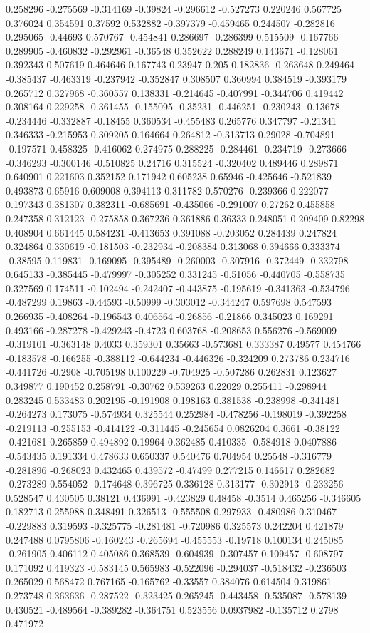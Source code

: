 0.258296 -0.275569 -0.314169 -0.39824 -0.296612 -0.527273 0.220246 0.567725 0.376024 0.354591 0.37592 0.532882 -0.397379 -0.459465 0.244507 -0.282816 0.295065 -0.44693 0.570767 -0.454841 0.286697 -0.286399 0.515509 -0.167766 0.289905 -0.460832 -0.292961 -0.36548 0.352622 0.288249 0.143671 -0.128061 0.392343 0.507619 0.464646 0.167743 0.23947 0.205 0.182836 -0.263648 0.249464 -0.385437 -0.463319 -0.237942 -0.352847 0.308507 0.360994 0.384519 -0.393179 0.265712 0.327968 -0.360557 0.138331 -0.214645 -0.407991 -0.344706 0.419442 0.308164 0.229258 -0.361455 -0.155095 -0.35231 -0.446251 -0.230243 -0.13678 -0.234446 -0.332887 -0.18455 0.360534 -0.455483 0.265776 0.347797 -0.21341 0.346333 -0.215953 0.309205 0.164664 0.264812 -0.313713 0.29028 -0.704891 -0.197571 0.458325 -0.416062 0.274975 0.288225 -0.284461 -0.234719 -0.273666 -0.346293 -0.300146 -0.510825 0.24716 0.315524 -0.320402 0.489446 0.289871 0.640901 0.221603 0.352152 0.171942 0.605238 0.65946 -0.425646 -0.521839 0.493873 0.65916 0.609008 0.394113 0.311782 0.570276 -0.239366 0.222077 0.197343 0.381307 0.382311 -0.685691 -0.435066 -0.291007 0.27262 0.455858 0.247358 0.312123 -0.275858 0.367236 0.361886 0.36333 0.248051 0.209409 0.82298 0.408904 0.661445 0.584231 -0.413653 0.391088 -0.203052 0.284439 0.247824 0.324864 0.330619 -0.181503 -0.232934 -0.208384 0.313068 0.394666 0.333374 -0.38595 0.119831 -0.169095 -0.395489 -0.260003 -0.307916 -0.372449 -0.332798 0.645133 -0.385445 -0.479997 -0.305252 0.331245 -0.51056 -0.440705 -0.558735 0.327569 0.174511 -0.102494 -0.242407 -0.443875 -0.195619 -0.341363 -0.534796 -0.487299 0.19863 -0.44593 -0.50999 -0.303012 -0.344247 0.597698 0.547593 0.266935 -0.408264 -0.196543 0.406564 -0.26856 -0.21866 0.345023 0.169291 0.493166 -0.287278 -0.429243 -0.4723 0.603768 -0.208653 0.556276 -0.569009 -0.319101 -0.363148 0.4033 0.359301 0.35663 -0.573681 0.333387 0.49577 0.454766 -0.183578 -0.166255 -0.388112 -0.644234 -0.446326 -0.324209 0.273786 0.234716 -0.441726 -0.2908 -0.705198 0.100229 -0.704925 -0.507286 0.262831 0.123627 0.349877 0.190452 0.258791 -0.30762 0.539263 0.22029 0.255411 -0.298944 0.283245 0.533483 0.202195 -0.191908 0.198163 0.381538 -0.238998 -0.341481 -0.264273 0.173075 -0.574934 0.325544 0.252984 -0.478256 -0.198019 -0.392258 -0.219113 -0.255153 -0.414122 -0.311445 -0.245654 0.0826204 0.3661 -0.38122 -0.421681 0.265859 0.494892 0.19964 0.362485 0.410335 -0.584918 0.0407886 -0.543435 0.191334 0.478633 0.650337 0.540476 0.704954 0.25548 -0.316779 -0.281896 -0.268023 0.432465 0.439572 -0.47499 0.277215 0.146617 0.282682 -0.273289 0.554052 -0.174648 0.396725 0.336128 0.313177 -0.302913 -0.233256 0.528547 0.430505 0.38121 0.436991 -0.423829 0.48458 -0.3514 0.465256 -0.346605 0.182713 0.255988 0.348491 0.326513 -0.555508 0.297933 -0.480986 0.310467 -0.229883 0.319593 -0.325775 -0.281481 -0.720986 0.325573 0.242204 0.421879 0.247488 0.0795806 -0.160243 -0.265694 -0.455553 -0.19718 0.100134 0.245085 -0.261905 0.406112 0.405086 0.368539 -0.604939 -0.307457 0.109457 -0.608797 0.171092 0.419323 -0.583145 0.565983 -0.522096 -0.294037 -0.518432 -0.236503 0.265029 0.568472 0.767165 -0.165762 -0.33557 0.384076 0.614504 0.319861 0.273748 0.363636 -0.287522 -0.323425 0.265245 -0.443458 -0.535087 -0.578139 0.430521 -0.489564 -0.389282 -0.364751 0.523556 0.0937982 -0.135712 0.2798 0.471972 